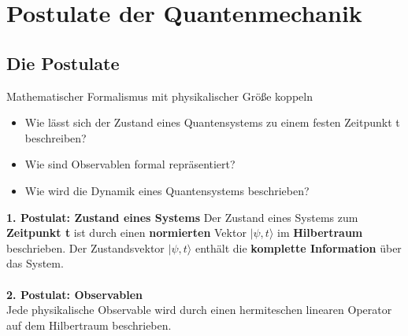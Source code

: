 \documentclass[10pt,article,colorback,accentcolor=tud9d]{scrartcl}
\begin{document}
\section{Postulate der Quantenmechanik}
\subsection{Die Postulate}
 Mathematischer Formalismus mit physikalischer Größe koppeln
      \begin{itemize}
        \item Wie lässt sich der Zustand eines Quantensystems zu einem festen Zeitpunkt t beschreiben?
        \item Wie sind Observablen formal repräsentiert?
        \item Wie wird die Dynamik eines Quantensystems beschrieben?
      \end{itemize}
  \textbf{1. Postulat: Zustand eines Systems}
    Der Zustand eines Systems zum \textbf{Zeitpunkt t} ist durch einen \textbf{normierten} Vektor $|\psi,t\rangle$ im \textbf{Hilbertraum} beschrieben. Der Zustandsvektor $|\psi,t\rangle$ enthält die \textbf{komplette Information} über das System.\\ \\
  \textbf{2. Postulat: Observablen}\\
    Jede physikalische Observable wird durch einen hermiteschen linearen Operator auf dem Hilbertraum beschrieben. 
\end{document}
